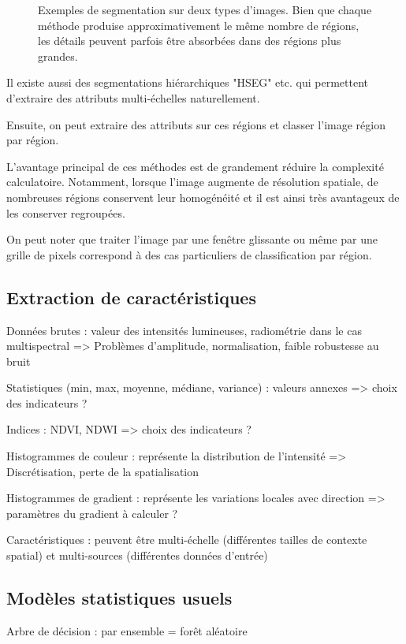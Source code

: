 \begin{figure}
\caption{Exemples de segmentation sur deux types d'images. Bien que chaque méthode produise approximativement le même nombre de régions, les détails peuvent parfois être absorbées dans des régions plus grandes.}
\label{fig:segmentation}
\end{figure}

Il existe aussi des segmentations hiérarchiques "HSEG" etc. qui permettent d'extraire des attributs multi-échelles naturellement.

Ensuite, on peut extraire des attributs sur ces régions et classer l'image région par région.

L'avantage principal de ces méthodes est de grandement réduire la complexité calculatoire. Notamment, lorsque l'image augmente de résolution spatiale, de nombreuses régions conservent leur homogénéité et il est ainsi très avantageux de les conserver regroupées.

On peut noter que traiter l'image par une fenêtre glissante ou même par une grille de pixels correspond à des cas particuliers de classification par région.

\subsection{Extraction de caractéristiques}

Données brutes : valeur des intensités lumineuses, radiométrie dans le cas multispectral
  => Problèmes d'amplitude, normalisation, faible robustesse au bruit

Statistiques (min, max, moyenne, médiane, variance) : valeurs annexes
  => choix des indicateurs ?

Indices : NDVI, NDWI
  => choix des indicateurs ?

Histogrammes de couleur : représente la distribution de l'intensité
  => Discrétisation, perte de la spatialisation

Histogrammes de gradient : représente les variations locales avec direction
  => paramètres du gradient à calculer ?

Caractéristiques : peuvent être multi-échelle (différentes tailles de contexte spatial) et multi-sources (différentes données d'entrée)

\subsection{Modèles statistiques usuels}

Arbre de décision : par ensemble = forêt aléatoire

